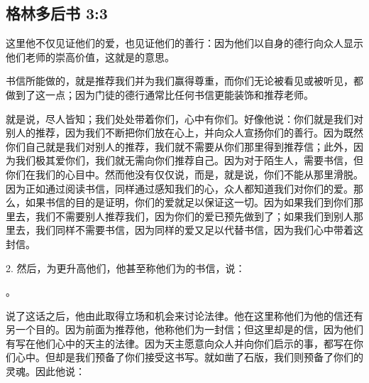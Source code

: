 
\subsection{格林多后书 3:3}

\par

这里他不仅见证他们的爱，也见证他们的善行：因为他们以自身的德行向众人显示他们老师的崇高价值，这就是的意思。\par

书信所能做的，就是推荐我们并为我们赢得尊重，而你们无论被看见或被听见，都做到了这一点；因为门徒的德行通常比任何书信更能装饰和推荐老师。\par

\par

就是说，尽人皆知；我们处处带着你们，心中有你们。好像他说：你们就是我们对别人的推荐，因为我们不断把你们放在心上，并向众人宣扬你们的善行。因为既然你们自己就是我们对别人的推荐，我们就不需要从你们那里得到推荐信；此外，因为我们极其爱你们，我们就无需向你们推荐自己。因为对于陌生人，需要书信，但你们在我们的心目中。然而他没有仅仅说，而是，就是说，你们不能从那里滑脱。因为正如通过阅读书信，同样通过感知我们的心，众人都知道我们对你们的爱。那么，如果书信的目的是证明，你们的爱就足以保证这一切。因为如果我们到你们那里去，我们不需要别人推荐我们，因为你们的爱已预先做到了；如果我们到别人那里去，我们同样不需要书信，因为同样的爱又足以代替书信，因为我们心中带着这封信。\par

2. 然后，为更升高他们，他甚至称他们为的书信，说：\par

。\par

说了这话之后，他由此取得立场和机会来讨论法律。他在这里称他们为他的信还有另一个目的。因为前面为推荐他，他称他们为一封信；但这里却是的信，因为他们有写在他们心中的天主的法律。因为天主愿意向众人并向你们启示的事，都写在你们心中。但却是我们预备了你们接受这书写。就如凿了石版，我们则预备了你们的灵魂。因此他说：\par

\par

